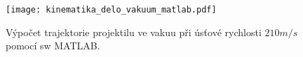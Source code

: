 \begin{example}
          
          \begin{lstlisting}[caption=\texttt{kinematika\_delo\_ve\_vakuu.m} pro ověření výpočtu balistické 
          dráhy projektilu.]
          \end{lstlisting}
          \begin{figure}[ht!]
            \centering
            \texttt{[image: kinematika\_delo\_vakuum\_matlab.pdf]}
            \caption[Výpočet trajektorie projektilu]{Výpočet trajektorie projektilu ve vakuu při
                     úsťové rychlosti $210 m/s$ pomocí sw
                     MATLAB\textsuperscript{\textregistered}.}
            \label{mech:fig_delo_matlab}
          \end{figure}
        \end{example}
        \newpage
